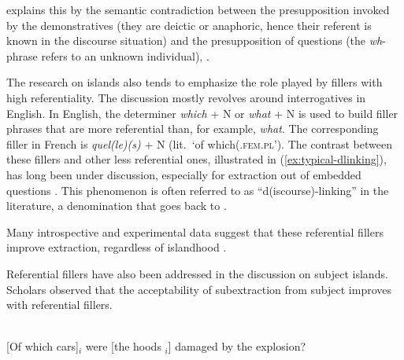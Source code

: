 \citet{Simonenko.2015} explains this by the semantic contradiction between the presupposition invoked by the demonstratives (they are deictic or anaphoric, hence their referent is known in the discourse situation) and the presupposition of questions (the \emph{wh}-phrase refers to an unknown individual), \citep[see also][]{Erteschik-Shir.1973}.

The research on islands also tends to emphasize the role played by fillers with high referentiality. The discussion mostly revolves around interrogatives in English. In English, the determiner \emph{which} + N or \emph{what} + N is used to build filler phrases that are more referential than, for example, \emph{what}. The corresponding filler in French is \emph{quel(le)(s)} + N (lit.\ `of which(.\textsc{fem}.\textsc{pl}'). The contrast between these fillers and other less referential ones, illustrated in (\ref{ex:typical-dlinking}), has long been under discussion, especially for extraction out of embedded questions \citep[e.g.][]{Pesetsky.1982,Kluender.1993.Bridging,Kluender.1993.Subjacency,Erteschik-Shir.2006,Jimenez-Fernandez.2009,Chaves.2013}. This phenomenon is often referred to as ``d(iscourse)-linking'' in the literature, a denomination that goes back to \citet{Pesetsky.1982}. 

\begin{exe}
\ex \citep[318]{Erteschik-Shir.2006}
\label{ex:typical-dlinking}
\begin{xlist}
\end{xlist}
\end{exe}

Many introspective and experimental data suggest that these referential fillers improve extraction, regardless of islandhood \citep{Kluender.1993.Bridging,Kluender.1993.Subjacency}. 


Referential fillers have also been addressed in the discussion on subject islands. Scholars observed that the acceptability of subextraction from subject improves with referential fillers.

\ea \citep[242]{Ross.1967}\\
{} [Of which cars]$_i$ were [the hoods \trace{}$_i$] damaged by the explosion? %
\z 

